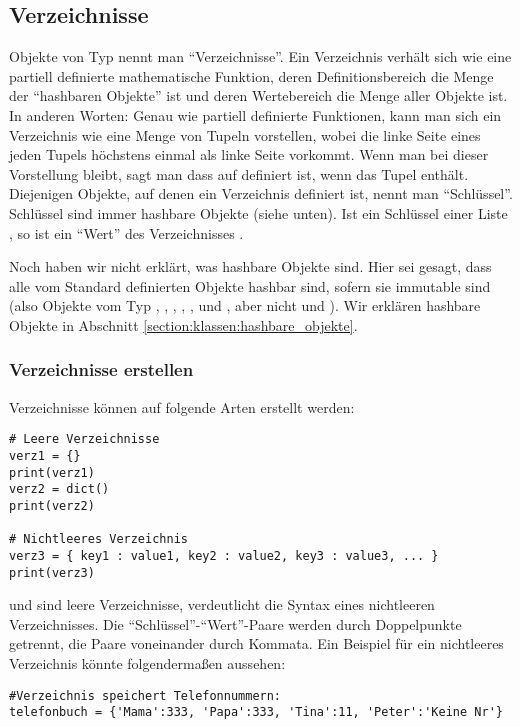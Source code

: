\subsection{Verzeichnisse}
\label{section:std_data_types:verzeichnisse}
Objekte von Typ  nennt man ``Verzeichnisse''.
Ein Verzeichnis verhält sich wie eine partiell definierte mathematische Funktion,
deren Definitionsbereich die Menge der ``hashbaren Objekte'' ist und deren Wertebereich die Menge aller Objekte ist.
In anderen Worten:
Genau wie partiell definierte Funktionen, kann man sich ein Verzeichnis  wie eine Menge von Tupeln  vorstellen,
wobei die linke Seite eines jeden Tupels höchstens einmal als linke Seite vorkommt.
Wenn man bei dieser Vorstellung bleibt, sagt man dass  auf  definiert ist, wenn  das Tupel  enthält.
Diejenigen Objekte, auf denen ein Verzeichnis definiert ist, nennt man ``Schlüssel''.
Schlüssel sind immer hashbare Objekte (siehe unten).
Ist  ein Schlüssel einer Liste , so ist  ein ``Wert'' des Verzeichnisses .

Noch haben wir nicht erklärt, was hashbare Objekte sind.
Hier sei gesagt, dass alle vom \Python Standard definierten Objekte hashbar sind, sofern sie immutable sind
(also Objekte vom Typ , , , , ,  und ,
aber nicht  und ).
Wir erklären hashbare Objekte in Abschnitt \ref{section:klassen:hashbare_objekte}.


\subsubsection{Verzeichnisse erstellen}
\label{section:std_data_types:verzeichnisse:verzeichnisse_erstellen}
Verzeichnisse können auf folgende Arten erstellt werden:
\begin{lstlisting}
# Leere Verzeichnisse
verz1 = {}
print(verz1)
verz2 = dict()
print(verz2)

# Nichtleeres Verzeichnis
verz3 = { key1 : value1, key2 : value2, key3 : value3, ... }
print(verz3)
\end{lstlisting}
 und  sind leere Verzeichnisse,  verdeutlicht die Syntax eines nichtleeren Verzeichnisses. Die 
``Schlüssel''-``Wert''-Paare werden durch Doppelpunkte getrennt, die Paare voneinander durch Kommata. Ein Beispiel für ein nichtleeres 
Verzeichnis könnte folgendermaßen aussehen:
\begin{lstlisting}
#Verzeichnis speichert Telefonnummern:
telefonbuch = {'Mama':333, 'Papa':333, 'Tina':11, 'Peter':'Keine Nr'}
\end{lstlisting}

